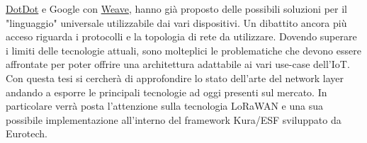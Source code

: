 \href{https://www.speakdotdot.com/dotdot/}{DotDot} e Google con
\href{https://developers.nest.com/weave/}{Weave}, hanno già proposto delle
possibili soluzioni per il "linguaggio" universale utilizzabile dai vari
dispositivi. Un dibattito ancora più acceso  riguarda i protocolli e la topologia di
rete da utilizzare. Dovendo superare i limiti delle tecnologie attuali, sono
molteplici le problematiche che devono essere affrontate per poter offrire una
architettura adattabile ai vari use-case dell'IoT.
Con questa tesi si cercherà di  approfondire lo stato dell'arte del network layer
andando a esporre le principali tecnologie ad oggi presenti sul mercato. In
particolare verrà posta l'attenzione sulla tecnologia LoRaWAN e una sua possibile
implementazione all'interno del framework Kura/ESF sviluppato da Eurotech.



